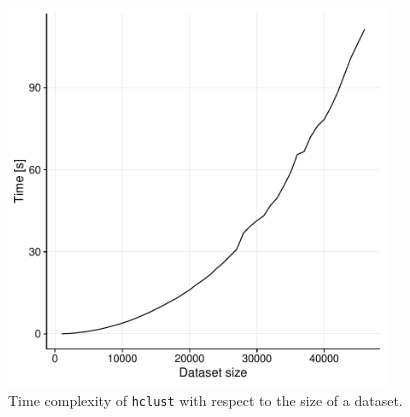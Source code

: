 \begin{figure}\centering
	\includegraphics[width=10cm]{img/hclust}
	\caption{Time complexity of \texttt{hclust} with respect to the size of a dataset.}
	\label{fig01:hclust}
\end{figure}
